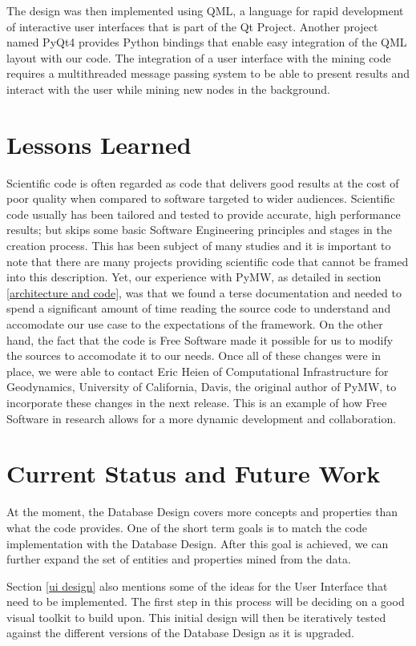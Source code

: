 \documentclass{sig-alternate}
\begin{document}
The design was then implemented using QML, a language for rapid development of interactive user interfaces that is part
of the Qt Project. Another project named PyQt4 provides Python bindings that enable easy integration of the QML layout
with our code. The integration of a user interface with the mining code requires a multithreaded message passing system
to be able to present results and interact with the user while mining new nodes in the background.

\section{Lessons Learned}
\label{mistakes}

Scientific code is often regarded as code that delivers good results at the cost of poor quality when compared to
software targeted to wider audiences. Scientific code usually has been tailored and tested to provide accurate, high
performance results; but skips some basic Software Engineering principles and stages in the creation process. This has
been subject of many studies \cite{Li:2011:RSS:1985782.1985789,Phadke:2005:PRM:1145319.1145337} and it is important to
note that there are many projects providing scientific code that cannot be framed into this description. Yet, our
experience with PyMW, as detailed in section \ref{architecture and code}, was that we found a terse documentation and
needed to spend a significant amount of time reading the source code to understand and accomodate our use case to the
expectations of the framework. On the other hand, the fact that the code is Free Software made it possible for us to
modify the sources to accomodate it to our needs. Once all of these changes were in place, we were able to contact Eric
Heien of Computational Infrastructure for Geodynamics, University of California, Davis, the original author of PyMW, to
incorporate these changes in the next release. This is an example of how Free Software in research allows for a more
dynamic development and collaboration.

\section{Current Status and Future Work}
\label{current status}

At the moment, the Database Design covers more concepts and properties than what the code provides. One of the short
term goals is to match the code implementation with the Database Design. After this goal is achieved, we can further
expand the set of entities and properties mined from the data.

Section \ref{ui design} also mentions some of the ideas for the User Interface that need to be implemented. The first
step in this process will be deciding on a good visual toolkit to build upon. This initial design will then be
iteratively tested against the different versions of the Database Design as it is upgraded.



\balance
\end{document}
